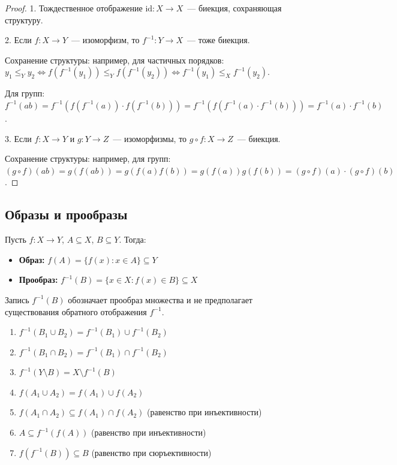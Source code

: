 \documentclass[12pt]{article}
\begin{document}
	\begin{proof}
		1. Тождественное отображение $\text{id}: X \to X$~--- биекция, сохраняющая структуру.
		
		2. Если $f: X \to Y$~--- изоморфизм, то $f^{-1}: Y \to X$~--- тоже биекция.
		
		Сохранение структуры: например, для частичных порядков: $y_1 \leqslant_Y y_2 \Leftrightarrow f(f^{-1}(y_1)) \leqslant_Y f(f^{-1}(y_2)) \Leftrightarrow f^{-1}(y_1) \leqslant_X f^{-1}(y_2)$.
		
		Для групп: $f^{-1}(ab) = f^{-1}(f(f^{-1}(a)) \cdot f(f^{-1}(b))) = f^{-1}(f(f^{-1}(a) \cdot f^{-1}(b))) = f^{-1}(a) \cdot f^{-1}(b)$.
		
		3. Если $f: X \to Y$ и $g: Y \to Z$~--- изоморфизмы, то $g \circ f: X \to Z$~--- биекция.
		
		Сохранение структуры: например, для групп: $(g \circ f)(ab) = g(f(ab)) = g(f(a)f(b)) = g(f(a))g(f(b)) = (g \circ f)(a) \cdot (g \circ f)(b)$.
	\end{proof}
	
	\subsection{Образы и прообразы}
	
	\begin{definition}
		Пусть $f: X \to Y$, $A \subseteq X$, $B \subseteq Y$. Тогда:
		\begin{itemize}
			\item \textbf{Образ:} $f(A) = \{f(x) : x \in A\} \subseteq Y$
			\item \textbf{Прообраз:} $f^{-1}(B) = \{x \in X : f(x) \in B\} \subseteq X$
		\end{itemize}
	\end{definition}
	
	\begin{note}
		Запись $f^{-1}(B)$ обозначает прообраз множества и не предполагает существования обратного отображения $f^{-1}$.
	\end{note}
	
	\begin{theorem}
		\begin{enumerate}
			\item $f^{-1}(B_1 \cup B_2) = f^{-1}(B_1) \cup f^{-1}(B_2)$
			\item $f^{-1}(B_1 \cap B_2) = f^{-1}(B_1) \cap f^{-1}(B_2)$
			\item $f^{-1}(Y \setminus B) = X \setminus f^{-1}(B)$
			\item $f(A_1 \cup A_2) = f(A_1) \cup f(A_2)$
			\item $f(A_1 \cap A_2) \subseteq f(A_1) \cap f(A_2)$ (равенство при инъективности)
			\item $A \subseteq f^{-1}(f(A))$ (равенство при инъективности)
			\item $f(f^{-1}(B)) \subseteq B$ (равенство при сюръективности)
		\end{enumerate}
	\end{theorem}
	
\end{document}
